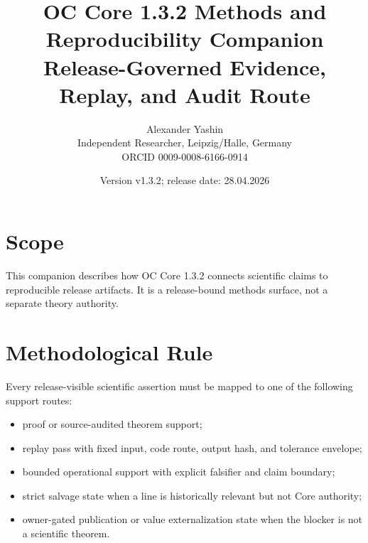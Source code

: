 \documentclass[11pt,a4paper]{article}
\title{\textbf{OC Core 1.3.2 Methods and Reproducibility Companion}\\
\large Release-Governed Evidence, Replay, and Audit Route}
\author{Alexander Yashin\\Independent Researcher, Leipzig/Halle, Germany\\ORCID 0009-0008-6166-0914}
\date{Version v1.3.2; release date: 28.04.2026}
\begin{document}
\maketitle

\section*{Scope}
This companion describes how OC Core 1.3.2 connects scientific claims to reproducible release artifacts. It is a release-bound methods surface, not a separate theory authority.

\section*{Methodological Rule}
Every release-visible scientific assertion must be mapped to one of the following support routes:
\begin{itemize}
  \item proof or source-audited theorem support;
  \item replay pass with fixed input, code route, output hash, and tolerance envelope;
  \item bounded operational support with explicit falsifier and claim boundary;
  \item strict salvage state when a line is historically relevant but not Core authority;
  \item owner-gated publication or value externalization state when the blocker is not a scientific theorem.
\end{itemize}
\end{document}

